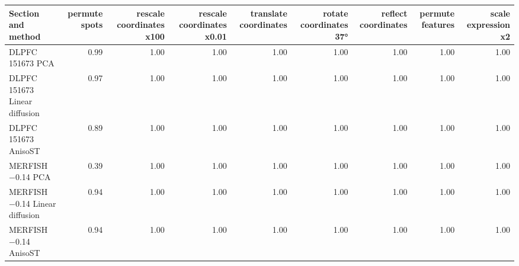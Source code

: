 \scriptsize
\begin{tabular}{lrrrrrrrr}
\toprule
Section and method & permute spots & rescale coordinates x100 & rescale coordinates x0.01 & translate coordinates & rotate coordinates 37° & reflect coordinates & permute features & scale expression x2 \\
\midrule
DLPFC 151673 PCA & 0.99 & 1.00 & 1.00 & 1.00 & 1.00 & 1.00 & 1.00 & 1.00 \\
DLPFC 151673 Linear diffusion & 0.97 & 1.00 & 1.00 & 1.00 & 1.00 & 1.00 & 1.00 & 1.00 \\
DLPFC 151673 AnisoST & 0.89 & 1.00 & 1.00 & 1.00 & 1.00 & 1.00 & 1.00 & 1.00 \\
MERFISH $-$0.14 PCA & 0.39 & 1.00 & 1.00 & 1.00 & 1.00 & 1.00 & 1.00 & 1.00 \\
MERFISH $-$0.14 Linear diffusion & 0.94 & 1.00 & 1.00 & 1.00 & 1.00 & 1.00 & 1.00 & 1.00 \\
MERFISH $-$0.14 AnisoST & 0.94 & 1.00 & 1.00 & 1.00 & 1.00 & 1.00 & 1.00 & 1.00 \\
\bottomrule
\end{tabular}
